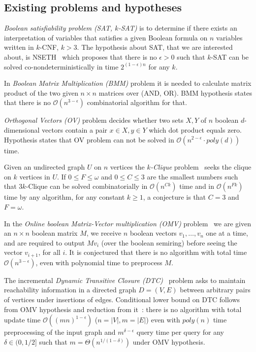 \documentclass[acmsmall,nonacm]{acmart}
\begin{document}
	\subsection{Existing problems and hypotheses}


	\emph{Boolean satisfiability problem (SAT, $k$-SAT)} is to determine if there exists an interpretation of variables that satisfies a given Boolean formula on $n$ variables written in $k$-CNF, $k > 3$. The hypothesis about SAT, that we are interested about, is NSETH~\cite{10.1145/2840728.2840746} which proposes that there is no $\epsilon > 0$ such that $k$-SAT can be solved co-nondeterministically in time $2^{(1 - \epsilon) n}$ for any $k$.

	In \emph{Boolean Matrix Multiplication (BMM)} problem it is needed to calculate matrix product of the two given $n \times n$ matrices over (AND, OR). BMM hypothesis states that there is no $\mathcal{O}(n^{3 - \epsilon})$ combinatorial algorithm for that. 

	\emph{Orthogonal Vectors (OV)} problem decides whether two sets $X, Y$ of $n$ boolean $d$-dimensional vectors contain a pair $x \in X, y \in Y$ which dot product equals zero. Hypothesis states that OV problem can not be solved in $\mathcal{O}(n^{2 - \epsilon} \cdot poly(d))$ time. 

	Given an undirected graph $U$ on $n$ vertices the \emph{$k$-Clique} problem~\cite{abboud2018if} seeks the clique on $k$ vertices in $U$.  If $0 \leq F \leq \omega$ and $0 \leq C \leq 3$ are the smallest numbers such that $3k$-Clique can be solved combinatorially in $\mathcal{O}(n^{Ck})$ time and in $\mathcal{O}(n^{Fk})$ time by any algorithm, for any constant $k \geq 1$, a conjecture is that $C = 3$ and $F = \omega$.

	In the \emph{Online boolean Matrix-Vector multiplication (OMV)} problem~\cite{10.5555/3039686.3039828} we are given an $n \times n$ boolean matrix $M$, we receive $n$ boolean vectors $v_1, \ldots, v_n$ one at a time, and are required to output $Mv_i$ (over the boolean semiring) before seeing the vector $v_{i+1}$, for all $i$. It is conjectured that there is no algorithm with total time $\mathcal{O}(n^{3-\epsilon})$, even with polynomial time to preprocess $M$.

	The incremental \emph{Dynamic Transitive Closure (DTC)}~\cite{Hanauer2020FasterFD} problem asks to maintain reachability information in a directed graph $D = (V, E)$ between arbitrary pairs of vertices under insertions of edges. Conditional lower bound on DTC follows from OMV hypothesis and reduction from it~\cite{10.1145/2746539.2746609}: there is no algorithm with total update time $\mathcal{O}((mn)^{1 - \epsilon})$ ($n = |V|, m = |E|$) even with $poly(n)$ time preprocessing of the input graph and $m^{\delta - \epsilon}$ query time per query for any $\delta \in (0, 1/2]$ such that $m = \Theta(n^{1/(1-\delta)})$ under OMV hypothesis.
\end{document}
